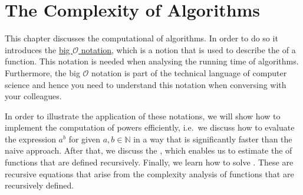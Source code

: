 \chapter{The Complexity of Algorithms} 
This chapter discusses the computational  of algorithms.  In order to do so it introduces the
\href{http://en.wikipedia.org/wiki/O_notation}{big $\mathcal{O}$ notation}, which is a notion that is used to
describe the  of a function.  
This  notation is needed when analysing the running time of algorithms.  Furthermore, the big $\mathcal{O}$
notation is part of the technical language of computer science and hence you need to understand this notation
when conversing with your colleagues.

In order to illustrate the application of these notations, we will show how to implement the computation of
powers efficiently, i.e.~we discuss how to evaluate the expression $a^b$ for given $a,b \in \mathbb{N}$ in a way that
is significantly faster than the naive approach.  After that, we discuss the , which
enables us to estimate the  of functions that are defined recursively.  Finally, we learn how to solve
.  These are recursive equations that arise from the complexity analysis of
functions that are recursively defined.

